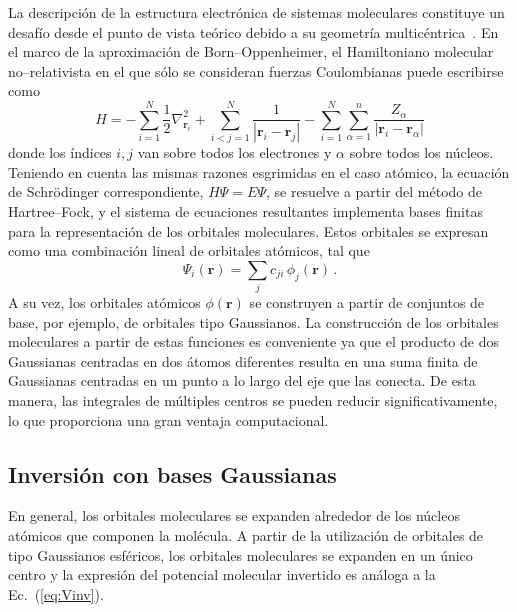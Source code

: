 La descripción de la estructura electrónica de sistemas moleculares 
constituye un desafío desde el punto de vista teórico debido a su 
geometría multicéntrica~\cite{Helgaker:00,Schaefer:04}. 
En el marco de la aproximación de Born--Oppenheimer, el Hamiltoniano 
molecular no--relativista en el que sólo se consideran fuerzas 
Coulombianas puede escribirse como
\begin{equation}
H=-\sum_{i=1}^N \frac{1}{2} \nabla^2_{\mathbf{r}_i} 
  +\sum_{i<j=1}^N \frac{1}{\left|\mathbf{r}_i-\mathbf{r}_j\right|} 
  -\sum_{i=1}^N \sum_{\alpha=1}^n \frac{Z_{\alpha}}{
    \left|\mathbf{r}_i-\mathbf{r}_{\alpha}\right|} 
\label{eq:BOhamiltonian}
\end{equation}
donde los índices $i,j$ van sobre todos los electrones y $\alpha$ 
sobre todos los núcleos. 
Teniendo en cuenta las mismas razones esgrimidas en el caso atómico, la 
ecuación de Schr\"odinger correspondiente, $H\Psi=E\Psi$, se resuelve a 
partir del método de Hartree--Fock, y el sistema de ecuaciones 
resultantes implementa bases finitas para la representación de los 
orbitales moleculares. Estos orbitales se expresan como una combinación 
lineal de orbitales atómicos, 
tal que
\begin{equation}
\Psi_i(\mathbf{r})=\sum_j c_{ji} \, \phi_j(\mathbf{r})\,.
\end{equation}
A su vez, los orbitales atómicos $\phi(\mathbf{r})$ se construyen a 
partir de conjuntos de base, por ejemplo, de orbitales tipo Gaussianos. 
La construcción de los orbitales moleculares a partir de estas funciones 
es conveniente ya que el producto de dos Gaussianas centradas en dos 
átomos diferentes resulta en una suma finita de Gaussianas centradas en 
un punto a lo largo del eje que las conecta. De esta manera, las 
integrales de múltiples centros se pueden reducir significativamente, lo 
que proporciona una gran ventaja computacional.

\subsection{Inversión con bases Gaussianas}
\label{sec:invmol}

En general, los orbitales moleculares se expanden alrededor de los 
núcleos atómicos que componen la molécula. A partir de la utilización
de orbitales de tipo Gaussianos esféricos, los orbitales moleculares se 
expanden en un único centro y la expresión del potencial molecular 
invertido es análoga a la Ec.~(\ref{eq:Vinv}). 


